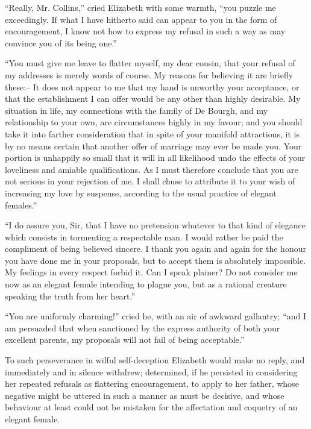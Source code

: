 “Really, Mr. Collins,” cried Elizabeth with some
warmth, “you puzzle me exceedingly. If what I have
hitherto said can appear to you in the form of encouragement,
I know not how to express my refusal in such a way
as may convince you of its being one.”

“You must give me leave to flatter myself, my dear
cousin, that your refusal of my addresses is merely
words of course. My reasons for believing it are briefly
these:-- It does not appear to me that my hand is unworthy
your acceptance, or that the establishment I can
offer would be any other than highly desirable. My
situation in life, my connections with the family of
De Bourgh, and my relationship to your own, are circumstances
highly in my favour; and you should take
it into farther consideration that in spite of your manifold
attractions, it is by no means certain that another offer
of marriage may ever be made you. Your portion is
unhappily so small that it will in all likelihood undo the
effects of your loveliness and amiable qualifications. As
I must therefore conclude that you are not serious in your
rejection of me, I shall chuse to attribute it to your wish
of increasing my love by suspense, according to the usual
practice of elegant females.”

“I do assure you, Sir, that I have no pretension
whatever to that kind of elegance which consists in
tormenting a respectable man. I would rather be paid
the compliment of being believed sincere. I thank you
again and again for the honour you have done me in
your proposals, but to accept them is absolutely impossible.
My feelings in every respect forbid it. Can
I speak plainer? Do not consider me now as an elegant
female intending to plague you, but as a rational creature
speaking the truth from her heart.”

“You are uniformly charming!” cried he, with an air
of awkward gallantry; “and I am persuaded that when
sanctioned by the express authority of both your excellent
parents, my proposals will not fail of being acceptable.”

To such perseverance in wilful self-deception Elizabeth
would make no reply, and immediately and in silence
withdrew; determined, if he persisted in considering her
repeated refusals as flattering encouragement, to apply
to her father, whose negative might be uttered in such
a manner as must be decisive, and whose behaviour
at least could not be mistaken for the affectation and
coquetry of an elegant female.


